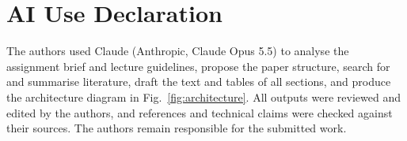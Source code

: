 \section*{AI Use Declaration}
The authors used Claude (Anthropic, Claude Opus 5.5) to analyse the assignment brief and lecture guidelines, propose the paper structure, search for and summarise literature, draft the text and tables of all sections, and produce the architecture diagram in Fig.~\ref{fig:architecture}. All outputs were reviewed and edited by the authors, and references and technical claims were checked against their sources. The authors remain responsible for the submitted work.
